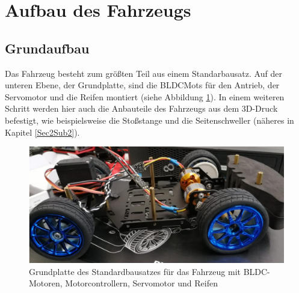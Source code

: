 

\pagestyle{fancy}
\rhead{\thepage} \chead{} 
\cfoot{}

\section{Aufbau des Fahrzeugs}\label{Sec2}

\subsection{Grundaufbau}\label{Sec2Sub1}

Das Fahrzeug besteht zum größten Teil aus einem Standarbausatz. Auf der unteren Ebene, der Grundplatte, sind die \acp{BLDCMot} für den Antrieb, der Servomotor und die Reifen montiert (siehe Abbildung \ref{fig:Grundplatte01}). In einem weiteren Schritt werden hier auch die Anbauteile des Fahrzeugs aus dem 3D-Druck befestigt, wie beispielsweise die Stoßstange und die Seitenschweller (näheres in Kapitel \ref{Sec2Sub2}).

\begin{figure}[H] %
\includegraphics[width=.90\textwidth]{sec2/images/Grundaufbau/Grundplatte01} 
\centering
\captionsetup{width=.95\textwidth}
\caption[Grundplatte des Standardbausatzes für das Fahrzeug]{Grundplatte des Standardbausatzes für das Fahrzeug mit BLDC-Motoren, Motorcontrollern, Servomotor und Reifen}\centering
\label{fig:Grundplatte01}
\end{figure}

